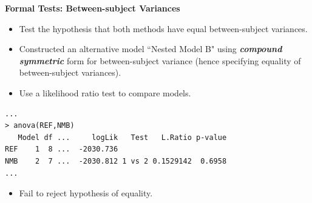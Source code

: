 \documentclass[compress]{beamer}        %
\makeatletter
\newcommand{\tcb}{\textcolor{beamer@blendedblue}}
\makeatother
\begin{document}
\begin{frame}[fragile]{\bf \tcb{Formal Tests: Between-subject Variances}}
\begin{itemize}
\item Test the hypothesis that both methods have equal between-subject variances.
\item Constructed an alternative model ``Nested Model B" using \textbf{\emph{compound symmetric}} form for between-subject variance (hence specifying equality of between-subject variances).
\item Use a likelihood ratio test to compare models.
\end{itemize}
\begin{verbatim}
...
> anova(REF,NMB)
   Model df ...     logLik   Test   L.Ratio p-value
REF    1  8 ...  -2030.736
NMB    2  7 ...  -2030.812 1 vs 2 0.1529142  0.6958
...
\end{verbatim}
\begin{itemize}
\item Fail to reject hypothesis of equality.
\end{itemize}
\end{frame}
\end{document}
